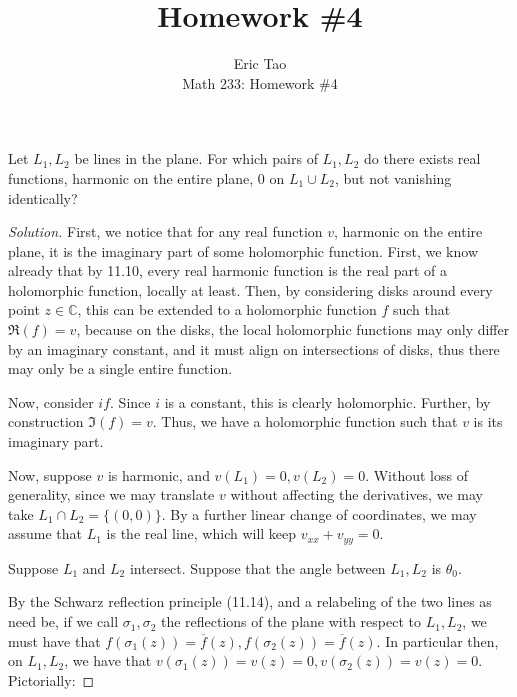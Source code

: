 \documentclass[10pt]{article}
\newenvironment{problem}[2][]{\begin{trivlist}
\item[\hskip \labelsep {\bfseries #1}\hskip \labelsep {\bfseries #2.}]}{\end{trivlist}}
\begin{document}
 
\title{Homework \#4}
\author{Eric Tao\\
Math 233: Homework \#4}
\maketitle

\begin{problem}{Question 1}

Let $L_1, L_2$ be lines in the plane. For which pairs of $L_1, L_2$ do there exists real functions, harmonic on the entire plane, 0 on $L_1 \cup L_2$, but not vanishing identically?

\end{problem}
\begin{proof}[Solution]

First, we notice that for any real function $v$, harmonic on the entire plane, it is the imaginary part of some holomorphic function. First, we know already that by 11.10, every real harmonic function is the real part of a holomorphic function, locally at least. Then, by considering disks around every point $z \in \mathbb{C}$, this can be extended to a holomorphic function $f$ such that $\Re(f) = v$, because on the disks, the local holomorphic functions may only differ by an imaginary constant, and it must align on intersections of disks, thus there may only be a single entire function.

Now, consider $i f$. Since $i$ is a constant, this is clearly holomorphic. Further, by construction $\Im(f) = v$. Thus, we have a holomorphic function such that $v$ is its imaginary part.

Now, suppose $v$ is harmonic, and $v(L_1) = 0, v(L_2) = 0$. Without loss of generality, since we may translate $v$ without affecting the derivatives, we may take $L_1 \cap L_2 = \{ (0,0)\}$. By a further linear change of coordinates, we may assume that $L_1$ is the real line, which will keep $v_{xx} + v_{yy} = 0$. 

Suppose $L_1$ and $L_2$ intersect.  Suppose that the angle between $L_1, L_2$ is $\theta_0$.

By the Schwarz reflection principle (11.14), and a relabeling of the two lines as need be, if we call $\sigma_1, \sigma_2$ the reflections of the plane with respect to $L_1, L_2$, we must have that $f(\sigma_1(z)) = \overline{f}(z), f(\sigma_2(z)) = \overline{f}(z)$. In particular then, on $L_1, L_2$, we have that $v(\sigma_1(z)) = v(z) = 0, v(\sigma_2(z)) = v(z) = 0$. Pictorially:


\end{proof}
\end{document}
